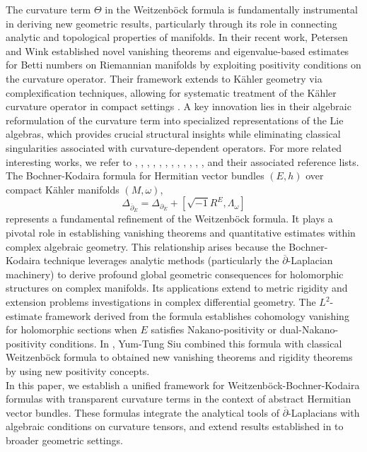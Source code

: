 \documentclass[12pt, reqno]{amsart}
\newcommand\bp{{\bar\partial}}
\theoremstyle{plain}
\theoremstyle{definition}
\newcommand{\sq}{\sqrt{-1}}
\newcommand{\p}{\partial}
\renewcommand{\bar}{\overline}
\newcommand{\beq}{\begin{equation}}
\newcommand{\eeq}{\end{equation}}
\renewcommand{\bp}{\bar{\partial}}
\renewcommand{\>}{\rightarrow}
\renewcommand{\#}{\sharp}
\numberwithin{equation}{section} %
\begin{document}
    The curvature term  $\Theta$ in the Weitzenb\"ock formula is fundamentally instrumental in deriving new geometric results, particularly through its role in connecting analytic and topological properties of manifolds. In their recent work, Petersen and Wink \cite{PetersenWink2021a} established novel vanishing theorems and eigenvalue-based estimates for Betti numbers on Riemannian manifolds by exploiting positivity conditions on the curvature operator. Their framework extends to K\"ahler geometry via complexification techniques, allowing for systematic treatment of the K\"ahler curvature operator in compact settings \cite{PetersenWink2021b}. A key innovation lies in their algebraic reformulation of the curvature term into specialized representations of the Lie algebras, which provides crucial structural insights while eliminating classical singularities associated with curvature-dependent operators. For more related interesting works, we refer to \cite{Wil13}, \cite{Yang2018}, \cite{PetersenWink2022}, \cite{NienhausPetersenWink2023}, \cite{Li23}, \cite{ChoDung2023}, \cite{CGT23}, \cite{BettiolGoodman24}, \cite{DaiFu2024}, \cite{Li24}, \cite{YZ25},  \cite{Xu2025}, and their associated reference lists. \\


    The Bochner-Kodaira formula for Hermitian vector bundles $(E,h)$ over compact K\"ahler manifolds $(M,\omega)$,
    \beq \Delta_{\bp_E}=\Delta_{\p_E}+\left[\sq R^E,\Lambda_\omega\right] \eeq
     represents a fundamental refinement of the Weitzenb\"ock formula. It plays a pivotal role in establishing vanishing theorems and quantitative estimates within complex algebraic geometry.
    This relationship arises because the Bochner-Kodaira technique leverages analytic methods (particularly the  $\bp$-Laplacian machinery) to derive profound global geometric consequences for holomorphic structures on complex manifolds. Its applications extend to  metric rigidity and extension problems investigations in complex differential geometry. The
    $L^2$-estimate framework derived from the formula establishes cohomology vanishing for holomorphic sections when $E$ satisfies Nakano-positivity or dual-Nakano-positivity conditions.  In \cite{Siu1980, Siu1982}, Yum-Tung Siu combined this formula with classical Weitzenb\"ock formula to obtained new vanishing theorems and rigidity theorems by using new positivity concepts.\\



    In this paper, we establish a unified framework for Weitzenb\"ock-Bochner-Kodaira formulas with transparent curvature terms in the context of abstract Hermitian vector bundles.  These formulas integrate the analytical tools of $\bp$-Laplacians with algebraic conditions on curvature tensors, and  extend results  established  in \cite{PetersenWink2021a,PetersenWink2021b}  to  broader geometric settings.
\end{document}

